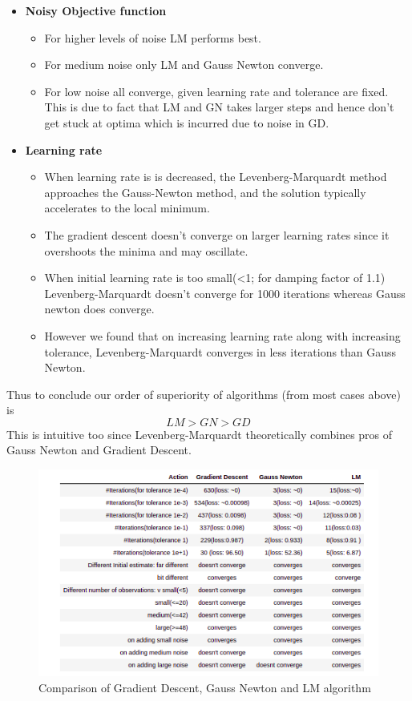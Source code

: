 \documentclass[journal]{IEEEtran}
\begin{document}
\begin{itemize}
    
\item \textbf{Noisy Objective function}
 \begin{itemize}
 \item For higher levels of noise LM performs best.
 \item For medium noise only LM and Gauss Newton converge.
 \item For low noise all converge, given learning rate and tolerance are fixed. This is due to fact that LM and GN takes larger steps and hence don't get stuck at optima which is incurred due to noise in GD.
 \end{itemize}

\item \textbf{Learning rate}
\begin{itemize}
\item When learning rate is  is decreased, the Levenberg-Marquardt method approaches the Gauss-Newton method, and the solution typically accelerates to the local minimum.
\item The gradient descent doesn't converge on larger learning rates since it overshoots the minima and may oscillate. 
\item When initial learning rate is too small(<1; for damping factor of 1.1) Levenberg-Marquardt doesn't converge for 1000 iterations whereas Gauss newton does converge.
\item However we found that on increasing learning rate along with increasing tolerance, Levenberg-Marquardt converges in less iterations than Gauss Newton. \\

\end{itemize}
\end{itemize}

Thus to conclude our order of superiority of algorithms (from most cases above) is 
$$ LM > GN > GD $$ 
This is intuitive too since Levenberg-Marquardt theoretically combines pros of Gauss Newton and Gradient Descent. 
 

\begin{figure}%
\centering
\includegraphics[width=1\linewidth]{Figures/table2}
\caption{Comparison of Gradient Descent, Gauss Newton and LM algorithm}
\label{table:Comparison}
\end{figure}
\end{document}
